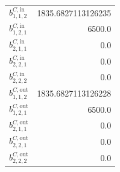 \documentclass{article}%
\begin{document}
\begin{multicols*}{3}
\begin{supertabular}{lr}
	$b_{1,1,2}^{C,\text{in}}$ & 1835.6827113126235 \\%
	$b_{1,2,1}^{C,\text{in}}$ & 6500.0 \\%
	$b_{2,1,1}^{C,\text{in}}$ & 0.0 \\%
	$b_{2,2,1}^{C,\text{in}}$ & 0.0 \\%
	$b_{2,2,2}^{C,\text{in}}$ & 0.0 \\%
	$b_{1,1,2}^{C,\text{out}}$ & 1835.6827113126228 \\%
	$b_{1,2,1}^{C,\text{out}}$ & 6500.0 \\%
	$b_{2,1,1}^{C,\text{out}}$ & 0.0 \\%
	$b_{2,2,1}^{C,\text{out}}$ & 0.0 \\%
	$b_{2,2,2}^{C,\text{out}}$ & 0.0 \\%
\end{supertabular}%
\end{multicols*}%
\end{document}
